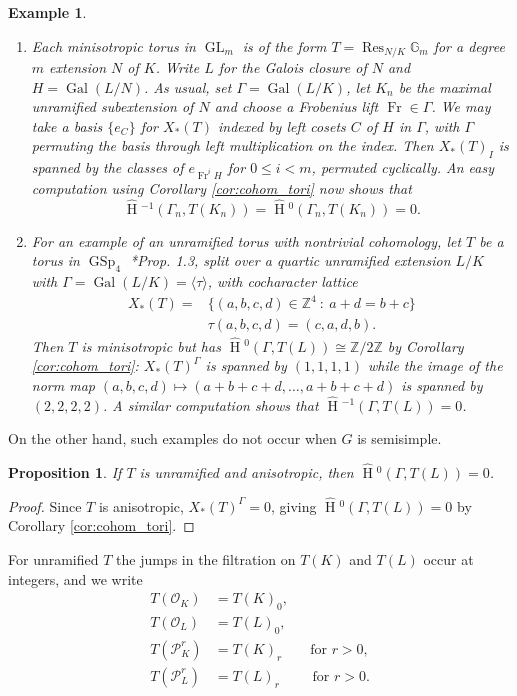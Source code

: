 \documentclass{amsart}
\theoremstyle{plain}
\newtheorem{proposition}[theorem]{Proposition}
\newtheorem{example}[theorem]{Example}
\newcommand{\HT}[1]{\hat{\HH}{}^{#1}}
\theoremstyle{definition}
\numberwithin{equation}{section}
\DeclareMathOperator{\Gal}{Gal}
\DeclareMathOperator{\HH}{H}
\DeclareMathOperator{\Res}{Res}
\DeclareMathOperator{\Fr}{Fr}
\DeclareMathOperator{\GL}{GL}
\DeclareMathOperator{\GSp}{GSp}
\newcommand{\OK}{\mathcal{O}_K}
\newcommand{\PK}{\mathcal{P}_K}
\newcommand{\PL}{\mathcal{P}_L}
\newcommand{\OL}{\mathcal{O}_L}
\newcommand{\ZZ}{\mathbb{Z}}
\newcommand{\Gm}{\mathbb{G}_m}
\begin{document}
\begin{example} $ $
\begin{enumerate}
\item Each minisotropic torus in $\GL_m$ is of the form $T = \Res_{N/K} \Gm$ for a degree $m$ extension $N$ of $K$.
Write $L$ for the Galois closure of $N$ and $H = \Gal(L/N)$.  As usual, set $\Gamma=\Gal(L/K)$, let $K_n$ be the
maximal unramified subextension of $N$ and choose a Frobenius lift $\Fr \in \Gamma$.
We may take a basis $\{e_C\}$ for $X_*(T)$ indexed by left cosets $C$ of $H$ in $\Gamma$, with $\Gamma$
permuting the basis through left multiplication on the index.  Then $X_*(T)_I$ is spanned by the classes of
$e_{\Fr^i H}$ for $0 \le i < m$, permuted cyclically.  An easy computation using Corollary \ref{cor:cohom_tori} now shows that
\[
\HT{-1}(\Gamma_n, T(K_n)) = \HT{0}(\Gamma_n, T(K_n)) = 0.
\]

\item For an example of an unramified torus with nontrivial cohomology, let $T$ be a torus in $\GSp_4$ \cite{morris:91a}*{Prop. 1.3}, split over a quartic unramified extension
$L/K$ with $\Gamma = \Gal(L/K) = \langle \tau \rangle$, with cocharacter lattice
\begin{align*}
X_*(T) = &\{(a,b,c,d) \in \ZZ^4 \: : \: a + d = b + c\} \\
& \tau(a,b,c,d) = (c,a,d,b).
\end{align*}
Then $T$ is minisotropic but has $\HT{0}(\Gamma, T(L)) \cong \ZZ/2\ZZ$ by Corollary \ref{cor:cohom_tori}:
$X_*(T)^\Gamma$ is spanned by $(1,1,1,1)$ while the image of the norm map $(a,b,c,d) \mapsto (a+b+c+d,\ldots,a+b+c+d)$
is spanned by $(2,2,2,2)$.  A similar computation shows that $\HT{-1}(\Gamma, T(L)) = 0$.
\end{enumerate}
\end{example}

On the other hand, such examples do not occur when $G$ is semisimple.

\begin{proposition}\label{prop:vanishing_H0}
If $T$ is unramified and anisotropic, then $\HT{0}(\Gamma, T(L)) = 0$.
\end{proposition}

\begin{proof}
Since $T$ is anisotropic, $X_*(T)^{\Gamma} = 0$, giving $\HT{0}(\Gamma, T(L)) = 0$ by Corollary
\ref{cor:cohom_tori}.
\end{proof}

For unramified $T$ the jumps in the filtration on $T(K)$ and $T(L)$ occur at integers, and we write
\begin{align*}
T(\OK) &= T(K)_0, \\
T(\OL) &= T(L)_0, \\
T(\PK^r) &= T(K)_r\qquad \mbox{for $r > 0$}, \\
T(\PL^r) &= T(L)_r\qquad\,\,\mbox{for $r > 0$}.
\end{align*}
\end{document}
